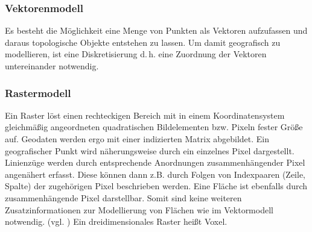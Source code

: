 \subsubsection{Vektorenmodell}

Es besteht die Möglichkeit eine Menge von Punkten als Vektoren aufzufassen und daraus topologische Objekte entstehen zu lassen.
Um damit geografisch zu modellieren, ist eine Diskretisierung d.\,h. eine Zuordnung der Vektoren untereinander notwendig. 

\subsubsection{Rastermodell}
Ein Raster löst einen rechteckigen Bereich mit in einem Koordinatensystem gleichmäßig angeordneten quadratischen Bildelementen bzw. Pixeln fester Größe auf.
Geodaten werden ergo mit einer indizierten Matrix abgebildet.
Ein geografischer Punkt wird näherungsweise durch ein einzelnes Pixel dargestellt.
Linienzüge werden durch entsprechende Anordnungen zusammenhängender Pixel angenähert erfasst.
Diese können dann z.B. durch Folgen von Indexpaaren (Zeile, Spalte) der zugehörigen Pixel beschrieben werden.
Eine Fläche ist ebenfalls durch zusammenhängende Pixel darstellbar.
Somit sind keine weiteren Zusatzinformationen zur Modellierung von Flächen wie im Vektormodell notwendig. (vgl. \cite[S.136]{book:gi-theopluspraxis3})
Ein dreidimensionales Raster heißt Voxel.

